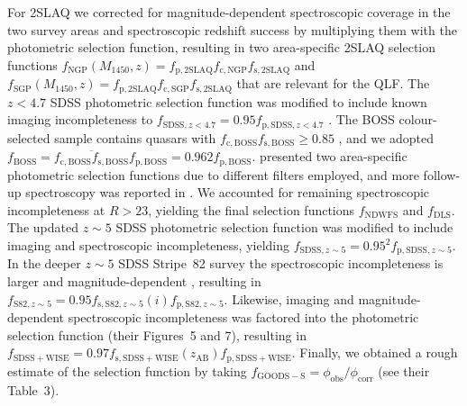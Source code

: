 \documentclass[a4paper,fleqn,usenatbib]{mnras}
\begin{document}
For 2SLAQ we corrected for magnitude-dependent spectroscopic coverage
in the two survey areas \citep[$f_\mathrm{c,NGP}\left(g\right)$ and
  $f_\mathrm{c,SGP}\left(g\right)$; Figure~4
  in][]{2009MNRAS.392...19C} and spectroscopic redshift success
\citep[$f_\mathrm{s,2SLAQ}\left(g\right)$; Figure~6b
  in][]{2009MNRAS.392...19C} by multiplying them with the photometric
selection function, resulting in two area-specific 2SLAQ selection
functions
$f_\mathrm{NGP}\left(M_{1450},z\right)=f_\mathrm{p,2SLAQ}f_\mathrm{c,NGP}f_\mathrm{s,2SLAQ}$
and
$f_\mathrm{SGP}\left(M_{1450},z\right)=f_\mathrm{p,2SLAQ}f_\mathrm{c,SGP}f_\mathrm{s,2SLAQ}$
that are relevant for the QLF.  The $z<4.7$ SDSS photometric selection
function was modified to include known imaging incompleteness to
$f_{\mathrm{SDSS},z<4.7}=0.95f_{\mathrm{p,SDSS},z<4.7}$
\citep{2006AJ....131.2766R}. The BOSS colour-selected sample contains
quasars with $f_\mathrm{c,BOSS}f_\mathrm{s,BOSS}\ge 0.85$
\citep{2013ApJ...773...14R}, and we adopted
$f_\mathrm{BOSS}=\overline{f_\mathrm{c,BOSS}f_\mathrm{s,BOSS}}f_\mathrm{p,BOSS}=0.962f_\mathrm{p,BOSS}$. \citet{2010ApJ...710.1498G}
presented two area-specific photometric selection functions due to
different filters employed, and more follow-up spectroscopy was
reported in \citet{2011ApJ...728L..26G}. We accounted for remaining
spectroscopic incompleteness at $R>23$, yielding the final selection
functions $f_\mathrm{NDWFS}$ and $f_\mathrm{DLS}$. The updated $z\sim
5$ SDSS photometric selection function \citep{2013ApJ...768..105M} was
modified to include imaging and spectroscopic incompleteness, yielding
$f_{\mathrm{SDSS},z\sim 5}=0.95^2f_{\mathrm{p,SDSS},z\sim 5}$. In the
deeper $z\sim 5$ SDSS Stripe~82 survey the spectroscopic
incompleteness is larger and magnitude-dependent \citep[Figure~14
  in][]{2013ApJ...768..105M}, resulting in $f_{\mathrm{S82},z\sim
  5}=0.95f_{\mathrm{s,S82},z\sim
  5}\left(i\right)f_{\mathrm{p,S82},z\sim 5}$. Likewise, imaging and
magnitude-dependent spectroscopic incompleteness was factored into the
\citet{2016ApJ...829...33Y} photometric selection function (their
Figures~5 and 7), resulting in
$f_\mathrm{SDSS+WISE}=0.97f_\mathrm{s,SDSS+WISE}\left(z_\mathrm{AB}\right)f_\mathrm{p,SDSS+WISE}$. Finally,
we obtained a rough estimate of the \citet{2015AA...578A..83G}
selection function by taking
$f_\mathrm{GOODS-S}=\phi_\mathrm{obs}/\phi_\mathrm{corr}$ (see their
Table~3).


\end{document}
